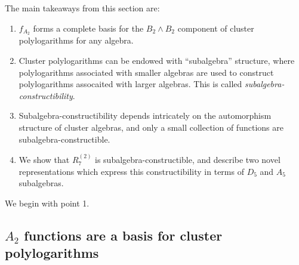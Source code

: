 \documentclass[11pt]{article}
\def\pdfeq#1{\texorpdfstring{$#1$}{a}}
\begin{document}
The main takeaways from this section are:
\begin{enumerate}
	\item $f_{A_2}$ forms a complete basis for the $B_2 \wedge B_2$ component of cluster polylogarithms for any algebra. 
	\item Cluster polylogarithms can be endowed with ``subalgebra'' structure, where polylogarithms associated with smaller algebras are used to construct polylogarithms assocaited with larger algebras. This is called \emph{subalgebra-constructibility}.
	\item Subalgebra-constructibility depends intricately on the automorphism structure of cluster algebras, and only a small collection of functions are subalgebra-constructible. 
	\item We show that $R^{(2)}_7$ is subalgebra-constructible, and describe two novel representations which express this constructibility in terms of $D_5$ and $A_5$ subalgebras. 
\end{enumerate}

We begin with point 1. 

\subsection{\pdfeq{A_2} functions are a basis for cluster polylogarithms}
\end{document}
